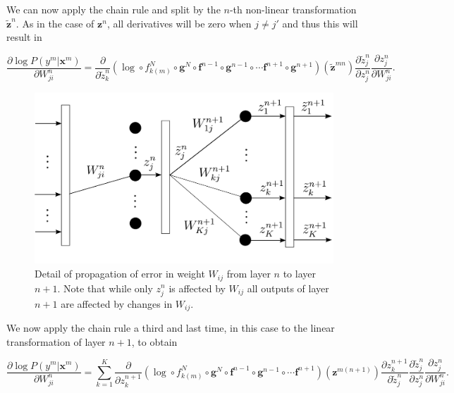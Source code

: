We can now apply the chain rule and split by the $n$-th non-linear
transformation $\tilde{\mathbf{z}}^n$. As in the case of $\mathbf{z}^n$, all
derivatives will be zero when $j\neq j'$ and thus this will result in

\begin{equation}
\frac{\partial \log P(y^m | \mathbf{x}^m)}{\partial W_{ji}^n} = \frac{\partial}{\partial \tilde{z}^{n}_{k}} (\log \circ f_{k(m)}^N \circ \mathbf{g}^N \circ \mathbf{f}^{n-1} \circ \mathbf{g}^{n-1} \circ \cdots \mathbf{f}^{n+1} \circ \mathbf{g}^{n+1})(\tilde{\mathbf{z}}^{mn})\frac{\partial \tilde{z}^n_{j}}{\partial z_{j}^n}\frac{\partial z^n_{j}}{\partial W_{ji}^n} .
\label{eq:partialfn3}
\end{equation}


\begin{figure}
\centering
\includegraphics[scale=0.4]{figs/deep_learning/LayerP2.pdf}
\caption{Detail of propagation of error in weight $W_{ij}$ from layer $n$ to
layer $n+1$. Note that while only $z_j^n$ is affected by $W_{ij}$ all outputs
of layer $n+1$ are affected by changes in $W_{ij}$.}
\label{fig:LayerP2}
\end{figure}

We now apply the chain rule a third and last time, in this case to the linear
transformation of layer $n+1$, to obtain

\begin{equation}
\frac{\partial \log P(y^m | \mathbf{x}^m)}{\partial W_{ji}^n} = \sum_{k=1}^K \frac{\partial}{\partial z^{n+1}_{k}} (\log \circ f_{k(m)}^N \circ \mathbf{g}^N \circ \mathbf{f}^{n-1} \circ \mathbf{g}^{n-1} \circ \cdots \mathbf{f}^{n+1})(\mathbf{z}^{m(n+1)})\frac{\partial z^{n+1}_k}{\partial \tilde{z}_{j}^n}\frac{\partial \tilde{z}^n_{j}}{\partial z_{j}^n}\frac{\partial z^n_{j}}{\partial W_{ji}^n} .
\label{eq:partialfn4}
\end{equation}

